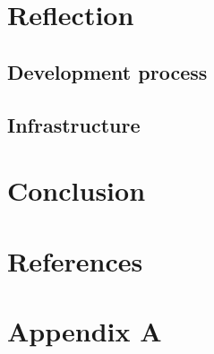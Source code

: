 \documentclass[a4paper,10pt]{article}
\begin{document}
    \section{Reflection}
    \subsection{Development process}
    \subsection{Infrastructure}
    \section{Conclusion}
    \section{References}
    
    \section{Appendix A}
    
\end{document}
